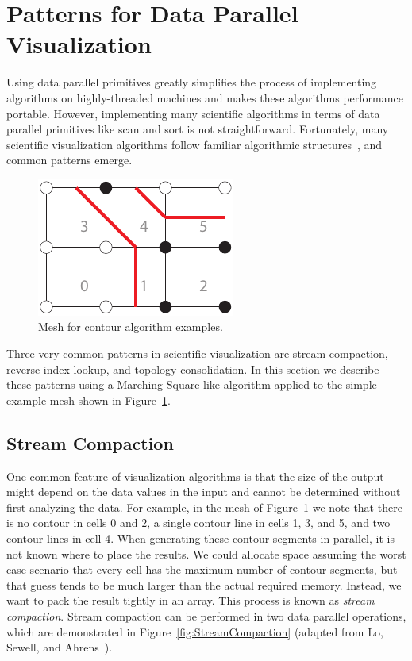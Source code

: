 \documentclass{superfri}
\newcommand*{\lcite}[1]{~\cite{#1}}
\newcommand*{\scite}[1]{~\cite{#1}}
\newcommand*{\keyterm}[1]{\emph{#1}}
\begin{document}
\section{Patterns for Data Parallel Visualization}

\noindent
Using data parallel primitives greatly simplifies the process of
implementing algorithms on highly-threaded machines and makes these
algorithms performance portable. However, implementing many scientific
algorithms in terms of data parallel primitives like scan and sort is not
straightforward. Fortunately, many scientific visualization algorithms
follow familiar algorithmic structures\lcite{Moreland2013:UltraVis}, and
common patterns emerge.

\begin{figure}
  \vspace{-\baselineskip}
  \includegraphics{images/ExampleMesh}
  \caption{Mesh for contour algorithm examples.}
  \label{fig:ExampleMesh}
  \vspace{-2\baselineskip}
\end{figure}

Three very common patterns in scientific visualization are stream
compaction, reverse index lookup, and topology consolidation. In this
section we describe these patterns using a Marching-Square-like algorithm
applied to the simple example mesh shown in Figure~\ref{fig:ExampleMesh}.

\subsection{Stream Compaction}

\noindent
One common feature of visualization algorithms is that the size of the
output might depend on the data values in the input and cannot be
determined without first analyzing the data. For example, in the mesh of
Figure~\ref{fig:ExampleMesh} we note that there is no contour in cells 0
and 2, a single contour line in cells 1, 3, and 5, and two contour lines in
cell 4. When generating these contour segments in parallel, it is not known
where to place the results. We could allocate space assuming the worst case
scenario that every cell has the maximum number of contour segments, but
that guess tends to be much larger than the actual required memory.
Instead, we want to pack the result tightly in an array. This process is
known as \keyterm{stream compaction}. Stream compaction can be performed in
two data parallel operations, which are demonstrated in
Figure~\ref{fig:StreamCompaction} (adapted from Lo, Sewell, and
Ahrens\scite{PISTON}).
\end{document}
